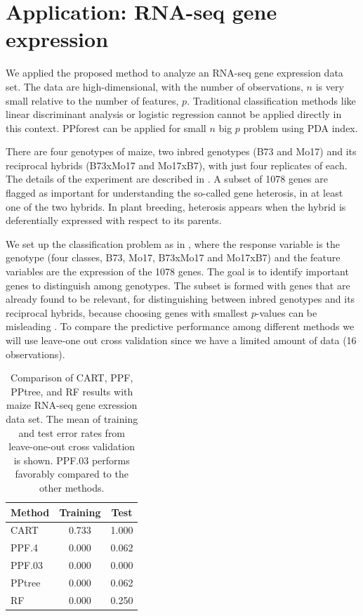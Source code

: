 \documentclass[12pt]{article}\usepackage[]{graphicx}\usepackage[]{color}
\begin{document}
\section{Application: RNA-seq gene expression}\label{rnaapli}

We applied the proposed method to analyze an RNA-seq gene expression data set. The data are high-dimensional, with the number of observations, $n$ is very small relative to the number of features, $p$. Traditional classification methods like linear discriminant analysis or logistic regression cannot be applied directly in this context. PPforest can be applied for small $n$ big $p$ problem using PDA index. 

There are four genotypes of maize, two inbred genotypes (B73 and Mo17) and its reciprocal hybrids (B73xMo17 and Mo17xB7), with just four replicates of each. The details of the experiment are described in \cite{paschold2012}. A subset of 1078 genes are flagged as important for understanding the so-called gene heterosis, in at least one of the two hybrids. In plant breeding, heterosis appears when the hybrid is deferentially expressed with respect to its parents. 

We set up the classification problem as in \cite{datta2014statistical}, where the response variable is the genotype (four classes, B73, Mo17, B73xMo17 and Mo17xB7) and the feature variables are the expression of the 1078 genes. The goal is to identify important genes to distinguish among genotypes. The subset is formed with genes that are already found to be relevant, for distinguishing between inbred genotypes and its reciprocal hybrids, because choosing genes with smallest $p$-values can be misleading \citep{cook2007exploring}. To compare the predictive performance among different methods we will use leave-one out cross validation since we have a limited amount of data (16 observations).
 
\begin{table}[ht]
\centering
\caption{Comparison of CART, PPF, PPtree, and RF results with maize RNA-seq gene exression data set. The mean of training and test error rates from leave-one-out cross validation is shown. PPF.03 performs favorably compared to the other methods. \label{res_RNA}} 
\begin{tabular}{l||c||c}
  \hline
Method & Training & Test \\ 
  \hline
CART & 0.733 & 1.000 \\ 
  PPF.4 & 0.000 & 0.062 \\ 
  PPF.03 & 0.000 & 0.000 \\ 
  PPtree & 0.000 & 0.062 \\ 
  RF & 0.000 & 0.250 \\ 
   \hline
\end{tabular}
\end{table}
\end{document}
